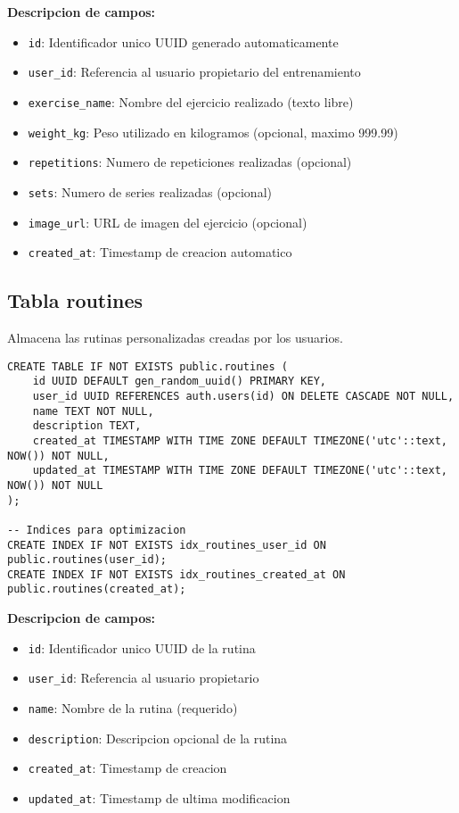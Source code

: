 \documentclass[12pt,a4paper]{article}
\begin{document}
\textbf{Descripcion de campos:}
\begin{itemize}
    \item \texttt{id}: Identificador unico UUID generado automaticamente
    \item \texttt{user\_id}: Referencia al usuario propietario del entrenamiento
    \item \texttt{exercise\_name}: Nombre del ejercicio realizado (texto libre)
    \item \texttt{weight\_kg}: Peso utilizado en kilogramos (opcional, maximo 999.99)
    \item \texttt{repetitions}: Numero de repeticiones realizadas (opcional)
    \item \texttt{sets}: Numero de series realizadas (opcional)
    \item \texttt{image\_url}: URL de imagen del ejercicio (opcional)
    \item \texttt{created\_at}: Timestamp de creacion automatico
\end{itemize}

\subsection{Tabla routines}

Almacena las rutinas personalizadas creadas por los usuarios.

\begin{lstlisting}[style=sqlstyle, caption=Estructura completa de routines]
CREATE TABLE IF NOT EXISTS public.routines (
    id UUID DEFAULT gen_random_uuid() PRIMARY KEY,
    user_id UUID REFERENCES auth.users(id) ON DELETE CASCADE NOT NULL,
    name TEXT NOT NULL,
    description TEXT,
    created_at TIMESTAMP WITH TIME ZONE DEFAULT TIMEZONE('utc'::text, NOW()) NOT NULL,
    updated_at TIMESTAMP WITH TIME ZONE DEFAULT TIMEZONE('utc'::text, NOW()) NOT NULL
);

-- Indices para optimizacion
CREATE INDEX IF NOT EXISTS idx_routines_user_id ON public.routines(user_id);
CREATE INDEX IF NOT EXISTS idx_routines_created_at ON public.routines(created_at);
\end{lstlisting}

\textbf{Descripcion de campos:}
\begin{itemize}
    \item \texttt{id}: Identificador unico UUID de la rutina
    \item \texttt{user\_id}: Referencia al usuario propietario
    \item \texttt{name}: Nombre de la rutina (requerido)
    \item \texttt{description}: Descripcion opcional de la rutina
    \item \texttt{created\_at}: Timestamp de creacion
    \item \texttt{updated\_at}: Timestamp de ultima modificacion
\end{itemize}
\end{document}
